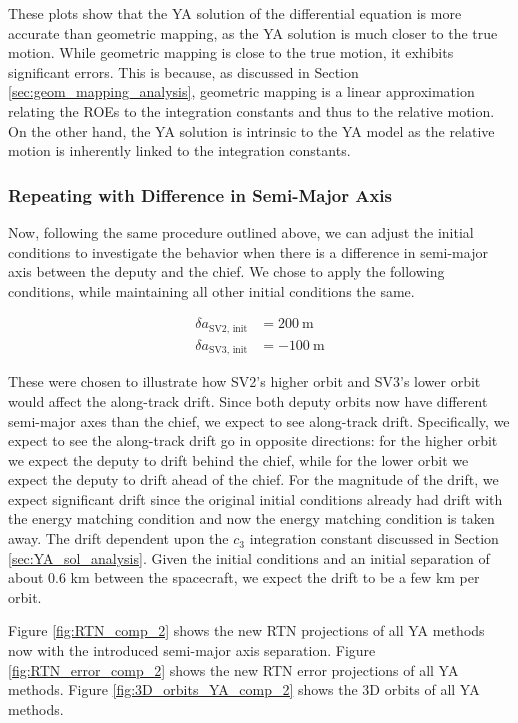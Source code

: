 These plots show that the YA solution of the differential equation is more accurate than geometric mapping, as the YA solution is much closer to the true motion. While geometric mapping is close to the true motion, it exhibits significant errors. This is because, as discussed in Section \ref{sec:geom_mapping_analysis}, geometric mapping is a linear approximation relating the ROEs to the integration constants and thus to the relative motion. On the other hand, the YA solution is intrinsic to the YA model as the relative motion is inherently linked to the integration constants. 

\subsubsection{Repeating with Difference in Semi-Major Axis}
Now, following the same procedure outlined above, we can adjust the initial conditions to investigate the behavior when there is a difference in semi-major axis between the deputy and the chief. We chose to apply the following conditions, while maintaining all other initial conditions the same. 

\begin{align*}
\delta a_{\text{SV2, init}} &= 200 \ \text{m} \\
\delta a_{\text{SV3, init}} &= -100 \ \text{m}
\end{align*}

These were chosen to illustrate how SV2's higher orbit and SV3's lower orbit would affect the along-track drift. Since both deputy orbits now have different semi-major axes than the chief, we expect to see along-track drift. Specifically, we expect to see the along-track drift go in opposite directions: for the higher orbit we expect the deputy to drift behind the chief, while for the lower orbit we expect the deputy to drift ahead of the chief. For the magnitude of the drift, we expect significant drift since the original initial conditions already had drift with the energy matching condition and now the energy matching condition is taken away. The drift dependent upon the $c_3$ integration constant discussed in Section \ref{sec:YA_sol_analysis}. Given the initial conditions and an initial separation of about 0.6 km between the spacecraft, we expect the drift to be a few km per orbit. 

Figure \ref{fig:RTN_comp_2} shows the new RTN projections of all YA methods now with the introduced semi-major axis separation. Figure \ref{fig:RTN_error_comp_2} shows the new RTN error projections of all YA methods. Figure \ref{fig:3D_orbits_YA_comp_2} shows the 3D orbits of all YA methods. 

